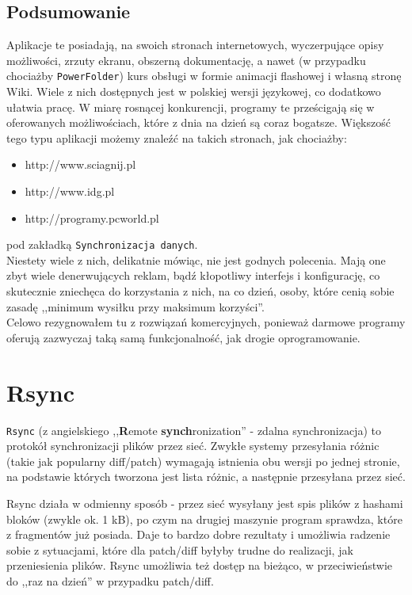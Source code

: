 \subsection{Podsumowanie}
Aplikacje te posiadają, na swoich stronach internetowych, wyczerpujące opisy możliwości, zrzuty ekranu, obszerną dokumentację, a nawet (w przypadku chociażby \verb|PowerFolder|) kurs obsługi w formie animacji flashowej i własną stronę Wiki. Wiele z nich dostępnych jest w polskiej wersji językowej, co dodatkowo ułatwia pracę. W miarę rosnącej konkurencji, programy te prześcigają się w oferowanych możliwościach, które z dnia na dzień są coraz bogatsze. 
Większość tego typu aplikacji możemy znaleźć na takich stronach, jak chociażby:
\begin{itemize}
\item http://www.sciagnij.pl
\item http://www.idg.pl
\item http://programy.pcworld.pl
\end{itemize}
pod zakładką \verb|Synchronizacja danych|. \\

Niestety wiele z nich, delikatnie mówiąc, nie jest godnych polecenia. Mają one zbyt wiele denerwujących reklam, bądź kłopotliwy interfejs i konfigurację, co skutecznie zniechęca do korzystania z nich, na co dzień, osoby, które cenią sobie zasadę ,,minimum wysiłku przy maksimum korzyści''. \\
Celowo rezygnowałem tu z rozwiązań komercyjnych, ponieważ darmowe programy oferują zazwyczaj taką samą funkcjonalność, jak drogie oprogramowanie.

\section{Rsync}
\label{rsyncskladnia}
\verb|Rsync| (z angielskiego ,,\textbf{R}emote \textbf{synch}ronization'' - zdalna synchronizacja) to protokół synchronizacji plików przez sieć. Zwykłe systemy przesyłania różnic (takie jak popularny diff/patch) wymagają istnienia obu wersji po jednej stronie, na podstawie których tworzona jest lista różnic, a następnie przesyłana przez sieć. 

Rsync działa w odmienny sposób - przez sieć wysyłany jest spis plików z hashami bloków (zwykle ok. 1 kB), po czym na drugiej maszynie program sprawdza, które z fragmentów już posiada. Daje to bardzo dobre rezultaty i umożliwia radzenie sobie z sytuacjami, które dla patch/diff byłyby trudne do realizacji, jak przeniesienia plików.
Rsync umożliwia też dostęp na bieżąco, w przeciwieństwie do ,,raz na dzień'' w przypadku patch/diff. \cite{5}

